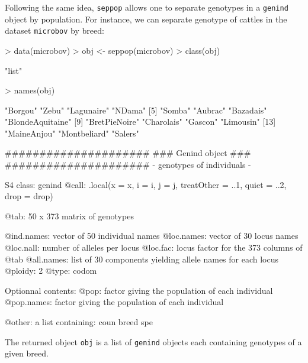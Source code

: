 \documentclass{article}
\begin{document}
Following the same idea, \texttt{seppop} allows one to separate genotypes
in a \texttt{genind} object by population.
For instance, we can separate genotype of cattles in the dataset \texttt{microbov}
by breed:
\begin{Schunk}
\begin{Sinput}
> data(microbov)
> obj <- seppop(microbov)
> class(obj)
\end{Sinput}
\begin{Soutput}
[1] "list"
\end{Soutput}
\begin{Sinput}
> names(obj)
\end{Sinput}
\begin{Soutput}
 [1] "Borgou"          "Zebu"            "Lagunaire"       "NDama"          
 [5] "Somba"           "Aubrac"          "Bazadais"        "BlondeAquitaine"
 [9] "BretPieNoire"    "Charolais"       "Gascon"          "Limousin"       
[13] "MaineAnjou"      "Montbeliard"     "Salers"         
\end{Soutput}
\begin{Soutput}
   #####################
   ### Genind object ### 
   #####################
- genotypes of individuals - 

S4 class:  genind
@call: .local(x = x, i = i, j = j, treatOther = ..1, quiet = ..2, drop = drop)

@tab:  50 x 373 matrix of genotypes

@ind.names: vector of  50 individual names
@loc.names: vector of  30 locus names
@loc.nall: number of alleles per locus
@loc.fac: locus factor for the  373 columns of @tab
@all.names: list of  30 components yielding allele names for each locus
@ploidy:  2
@type:  codom

Optionnal contents: 
@pop:  factor giving the population of each individual
@pop.names:  factor giving the population of each individual

@other: a list containing: coun  breed  spe 
\end{Soutput}
\end{Schunk}

\noindent The returned object \texttt{obj} is a list of \texttt{genind}
objects each containing genotypes of a given breed.
\\
\end{document}

